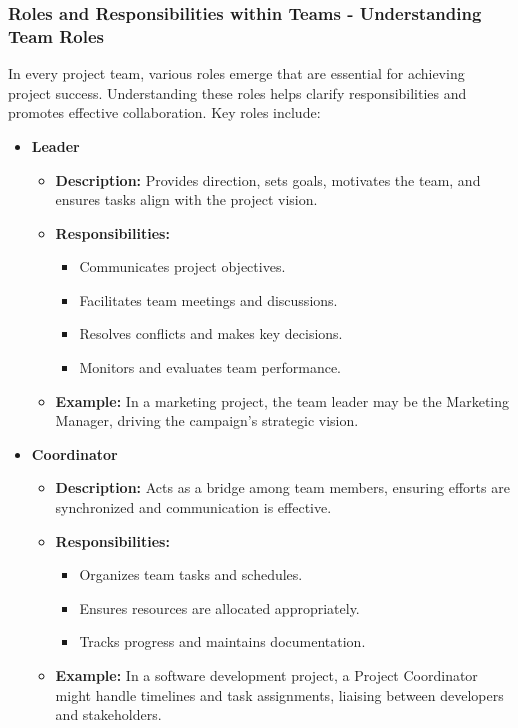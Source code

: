 \documentclass[aspectratio=169]{beamer}
\begin{document}
\begin{frame}[fragile]
    \frametitle{Roles and Responsibilities within Teams - Understanding Team Roles}
    In every project team, various roles emerge that are essential for achieving project success. Understanding these roles helps clarify responsibilities and promotes effective collaboration. Key roles include:
    
    \begin{itemize}
        \item \textbf{Leader}
            \begin{itemize}
                \item \textbf{Description:} Provides direction, sets goals, motivates the team, and ensures tasks align with the project vision.
                \item \textbf{Responsibilities:}
                    \begin{itemize}
                        \item Communicates project objectives.
                        \item Facilitates team meetings and discussions.
                        \item Resolves conflicts and makes key decisions.
                        \item Monitors and evaluates team performance.
                    \end{itemize}
                \item \textbf{Example:} In a marketing project, the team leader may be the Marketing Manager, driving the campaign's strategic vision.
            \end{itemize}
        
        \item \textbf{Coordinator}
            \begin{itemize}
                \item \textbf{Description:} Acts as a bridge among team members, ensuring efforts are synchronized and communication is effective.
                \item \textbf{Responsibilities:}
                    \begin{itemize}
                        \item Organizes team tasks and schedules.
                        \item Ensures resources are allocated appropriately.
                        \item Tracks progress and maintains documentation.
                    \end{itemize}
                \item \textbf{Example:} In a software development project, a Project Coordinator might handle timelines and task assignments, liaising between developers and stakeholders.
            \end{itemize}
        

\end{itemize}
\end{frame}
\end{document}
